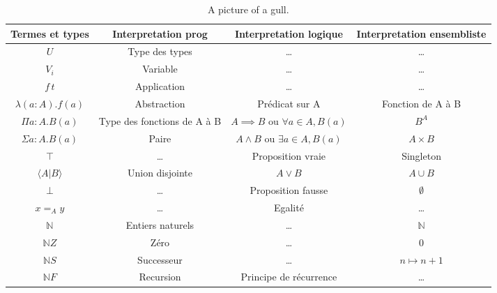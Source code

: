\documentclass[12pt, a4paper]{article}
\begin{document}
\small\begin{table}[h!]\begin{center}\begin{tabular}{ | c | c | c | c | }
\hline
Termes et types & Interpretation prog & Interpretation logique & Interpretation ensembliste \\
\hline
$U$                     & Type des types\footnotemark[1]   & \dots                                      & \dots              \\
$V_i$                   & Variable                         & \dots                                      & \dots              \\
$f\,t$                  & Application                      & \dots                                      & \dots              \\
\hline   
$\lambda (a : A). f(a)$ & Abstraction                      & Prédicat sur A                             & Fonction de A à B  \\
$\Pi{a : A}. B(a)$      & Type des fonctions de A à B      & $A \implies B$ ou $\forall a \in A, B(a)$  & $B^A$           \\
\hline   
$\Sigma{a : A}. B(a)$   & Paire                            & $A \wedge B$ ou $\exists a \in A, B(a)$    & $A \times B$    \\
$\top$                  & \dots                            & Proposition vraie                          & Singleton          \\
\hline   
$\langle A | B \rangle$ & Union disjointe                  & $A \vee B$                                 & $A \cup B$         \\
$\bot$                  & \dots                            & Proposition fausse                         & $\emptyset$        \\
\hline   
$x =_A y$               & \dots                            & Egalité                                    & \dots              \\
\hline   
$\mathbb{N}$            & Entiers naturels\footnotemark[2] & \dots                                      & $\mathbb{N}$       \\
$\mathbb{N}Z$           & Zéro                             & \dots                                      & $0$                \\
$\mathbb{N}S$           & Successeur                       & \dots                                      & $n \mapsto n+1$    \\
$\mathbb{N}F$           & Recursion                        & Principe de récurrence                     & \dots              \\
\hline
\end{tabular}\end{center}\caption{A picture of a gull.}\end{table}
\end{document}
